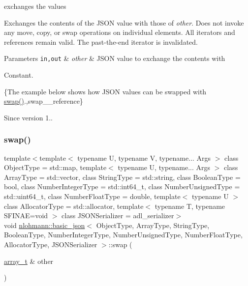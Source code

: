 exchanges the values 

Exchanges the contents of the J\+S\+ON value with those of {\itshape other}. Does not invoke any move, copy, or swap operations on individual elements. All iterators and references remain valid. The past-\/the-\/end iterator is invalidated.


\begin{DoxyParams}[1]{Parameters}
\mbox{\tt in,out}  & {\em other} & J\+S\+ON value to exchange the contents with\\
\hline
\end{DoxyParams}
Constant.

\{The example below shows how J\+S\+ON values can be swapped with {\ttfamily \mbox{\hyperlink{classnlohmann_1_1basic__json_a8c9d932353e1ab98a7dc2fc27e002031}{swap()}}}.,swap\+\_\+\+\_\+reference\}

\begin{DoxySince}{Since}
version 1.. 
\end{DoxySince}
\mbox{\label{classnlohmann_1_1basic__json_a65b0a24e1361a030ad0a661de22f6c8e}} 
\subsubsection{\texorpdfstring{swap()}{swap()}\hspace{0.1cm}{\footnotesize\ttfamily [2/4]}}
{\footnotesize\ttfamily template$<$template$<$ typename U, typename V, typename... Args $>$ class Object\+Type = std\+::map, template$<$ typename U, typename... Args $>$ class Array\+Type = std\+::vector, class String\+Type  = std\+::string, class Boolean\+Type  = bool, class Number\+Integer\+Type  = std\+::int64\+\_\+t, class Number\+Unsigned\+Type  = std\+::uint64\+\_\+t, class Number\+Float\+Type  = double, template$<$ typename U $>$ class Allocator\+Type = std\+::allocator, template$<$ typename T, typename S\+F\+I\+N\+A\+E=void $>$ class J\+S\+O\+N\+Serializer = adl\+\_\+serializer$>$ \\
void \mbox{\hyperlink{classnlohmann_1_1basic__json}{nlohmann\+::basic\+\_\+json}}$<$ Object\+Type, Array\+Type, String\+Type, Boolean\+Type, Number\+Integer\+Type, Number\+Unsigned\+Type, Number\+Float\+Type, Allocator\+Type, J\+S\+O\+N\+Serializer $>$\+::swap (\begin{DoxyParamCaption}\item[{\mbox{\hyperlink{classnlohmann_1_1basic__json_ae095578e03df97c5b3991787f1056374}{array\+\_\+t}} \&}]{other }\end{DoxyParamCaption})\hspace{0.3cm}{\ttfamily [inline]}}



